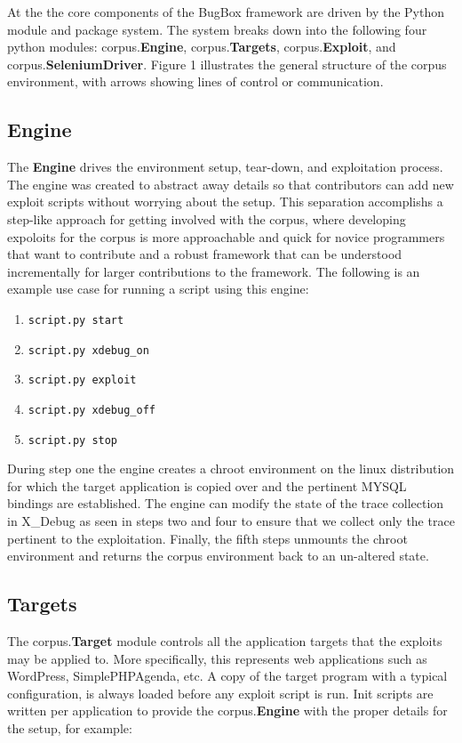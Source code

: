 \documentclass[letterpaper,twocolumn,10pt]{article}
\begin{document}
At the the core components of the BugBox framework are driven by the Python module and package system. The system breaks down into the following four python modules: corpus.{\bf Engine}, corpus.{\bf Targets}, corpus.{\bf Exploit}, and corpus.{\bf SeleniumDriver}.
Figure 1 illustrates the general structure of the corpus environment, with arrows showing lines of control or communication.  

\subsection{Engine}
The {\bf Engine} drives the environment setup, tear-down, and exploitation process.  The engine was created to abstract away details so that contributors can add new exploit scripts without worrying about the setup.  This separation accomplishs a step-like approach for getting involved with the corpus, where developing expoloits for the corpus is more approachable and quick for novice programmers that want to contribute and a robust framework that can be understood incrementally for larger contributions to the framework.  The following is an  example use case for running a script using this engine:

\begin{enumerate}
	\item {\tt script.py start}
	\item {\tt script.py xdebug\_on}
	\item {\tt script.py exploit}
	\item {\tt script.py xdebug\_off}
	\item {\tt script.py stop}
\end{enumerate}

During step one the engine creates a chroot environment on the linux distribution for which the target application is copied over and the pertinent MYSQL bindings are established.  The engine can modify the state of the trace collection in X\_Debug as seen in steps two and four to ensure that we collect only the trace pertinent to the exploitation.  Finally, the fifth steps unmounts the chroot environment and returns the corpus environment back to an un-altered state.

\subsection{Targets}

   The corpus.{\bf Target} module controls all the application targets that the exploits may be applied to.  More specifically, this represents web applications such as WordPress, SimplePHPAgenda, etc. A copy of the target program with a typical configuration, is always loaded before any exploit script is run.  Init scripts are written per application to provide the corpus.{\bf Engine} with the proper details for the setup, for example:
\end{document}
